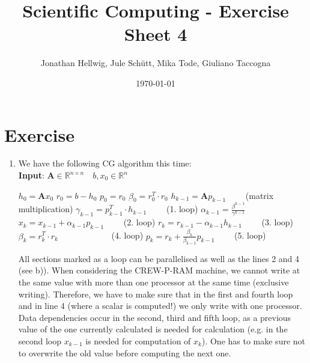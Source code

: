\documentclass{article}
\title{Scientific Computing - Exercise Sheet 4}
\author{Jonathan Hellwig, Jule Schütt, Mika Tode, Giuliano Taccogna}
\date{\today}
\begin{document}
\maketitle

\section{Exercise}
\begin{enumerate}[label=(\alph*)]
\item We have the following CG algorithm this time:\\

   \textbf{Input}: $ \textbf{A} \in \mathbb{R}^{n\times n} \quad b, x_0\in \mathbb{R}^n$
    \begin{algorithmic}[1]
	\State $h_{0} = \textbf{A}x_{0}$ 
	\State $r_0 = b - h_0$
	\State $p_0 = r_0$
	\State $\beta_0 = r_0^T\cdot r_0$
	\State $h_{k-1} = \textbf{A}p_{k-1}\qquad$ (matrix multiplication)
	\State $\gamma_{k-1} = p^{T}_{k-1}\cdot h_{k-1}\qquad$ (1. loop)
	\State $\alpha_{k-1} = \frac{\beta^{k-1}}{\gamma^{k-1}}$
	\State $x_k = x_{k-1} + \alpha_{k-1}p_{k-1}\qquad$ (2. loop)
	\State $r_k = r_{k-1} - \alpha_{k-1}h_{k-1}\qquad$ (3. loop)
	\State $\beta_k = r_k^T\cdot r_k\qquad \qquad \qquad$ (4. loop)
	\State $p_k = r_{k} + \frac{\beta_k}{\beta_{k-1}}p_{k-1}\qquad$ (5. loop)
	\EndFor
    \end{algorithmic}
All sections marked as a loop can be parallelised as well as the lines 2 and 4 (see b)). When considering the CREW-P-RAM machine, we cannot write at the same value with more than one processor at the same time (exclusive writing). Therefore, we have to make sure that in the first and fourth loop and in line 4 (where a scalar is computed!) we only write with one processor.\\
Data dependencies occur in the second, third and fifth loop, as a previous value of the one currently calculated is needed for calculation (e.g. in the second loop $x_{k-1}$ is needed for computation of $x_k$). One has to make sure not to overwrite the old value before computing the next one.




\end{enumerate}
\end{document}
